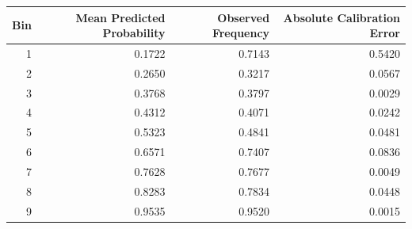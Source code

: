 \begin{tabular}{rrrr}
\toprule
Bin & Mean Predicted Probability & Observed Frequency & Absolute Calibration Error \\
\midrule
1 & 0.1722 & 0.7143 & 0.5420 \\
2 & 0.2650 & 0.3217 & 0.0567 \\
3 & 0.3768 & 0.3797 & 0.0029 \\
4 & 0.4312 & 0.4071 & 0.0242 \\
5 & 0.5323 & 0.4841 & 0.0481 \\
6 & 0.6571 & 0.7407 & 0.0836 \\
7 & 0.7628 & 0.7677 & 0.0049 \\
8 & 0.8283 & 0.7834 & 0.0448 \\
9 & 0.9535 & 0.9520 & 0.0015 \\
\bottomrule
\end{tabular}
